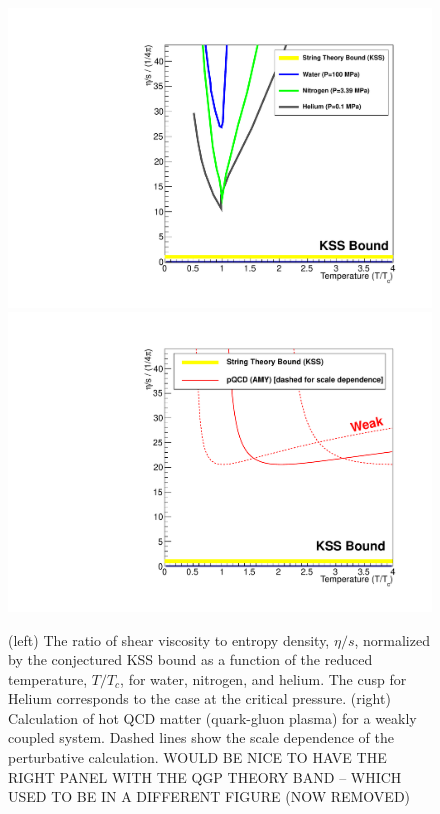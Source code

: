 \begin{figure}[t]
 \begin{center}
    \includegraphics[trim = 2 2 2 2, clip, width=\twowidth]{figs/figure_physicscase_etaovers_liquids}
    \hfill
    \includegraphics[trim = 2 2 2 2, clip, width=\twowidth]{figs/figure_physicscase_etaovers_qgpweak}
    \caption[$\eta/s$ vs $T/T_{c}$ for water, nitrogen, and
    helium]{(left) The ratio of shear viscosity to entropy density,
      $\eta/s$, normalized by the conjectured KSS bound as a function
      of the reduced temperature, $T/T_{c}$, for water, nitrogen, and
      helium. The cusp for Helium corresponds to the case at the
      critical pressure.  (right) Calculation of hot QCD matter
      (quark-gluon plasma) for a weakly coupled system.  Dashed lines
      show the scale dependence of the perturbative calculation.  WOULD BE NICE TO HAVE THE RIGHT PANEL WITH THE QGP THEORY BAND -- WHICH USED TO BE IN A DIFFERENT FIGURE (NOW REMOVED)}
    \label{fig:etaovers_1}
 \end{center}
\end{figure}

